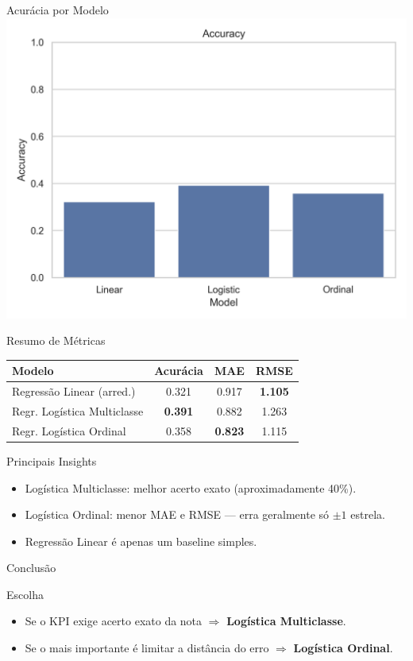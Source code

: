 \documentclass{beamer}
\begin{document}
\begin{frame}{Acurácia por Modelo}
  \centering
  \includegraphics[width=0.55\linewidth]{../figures/accuracy.png}
\end{frame}

\begin{frame}{Resumo de Métricas}
  \footnotesize
  \begin{table}[h]
    \centering
    \begin{tabular}{lccc}
      \toprule
      \textbf{Modelo}             & \textbf{Acurácia} & \textbf{MAE}   & \textbf{RMSE}  \\
      \midrule
      Regressão Linear (arred.)   & 0.321             & 0.917          & \textbf{1.105} \\
      Regr. Logística Multiclasse & \textbf{0.391}    & 0.882          & 1.263          \\
      Regr. Logística Ordinal     & 0.358             & \textbf{0.823} & 1.115          \\
      \bottomrule
    \end{tabular}
  \end{table}
\end{frame}

\begin{frame}{Principais Insights}
  \begin{itemize}
    \item Logística Multiclasse: melhor acerto exato (aproximadamente 40\%).
    \item Logística Ordinal: menor MAE e RMSE — erra geralmente só \(\pm 1\) estrela.
    \item Regressão Linear é apenas um baseline simples.
  \end{itemize}
\end{frame}

\begin{frame}{Conclusão}
  \begin{block}{Escolha}
    \begin{itemize}
      \item Se o KPI exige acerto exato da nota \(\Rightarrow\) \textbf{Logística Multiclasse}.
      \item Se o mais importante é limitar a distância do erro \(\Rightarrow\) \textbf{Logística Ordinal}.
    \end{itemize}
  \end{block}
\end{frame}
\end{document}
